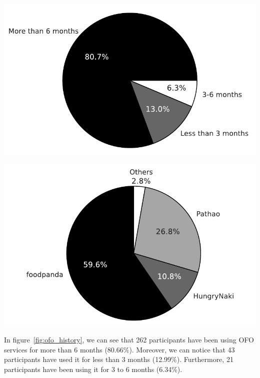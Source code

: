 \documentclass[a4paper,fleqn]{cas-sc}
\begin{document}
\begin{minipage}{.5\textwidth}
\centering
  \includegraphics[width=.9\linewidth]{figs/ordering_history.pdf}
  \label{fig:ofo_history}
\end{minipage}%
\begin{minipage}{.5\textwidth}
\centering
  \includegraphics[width=.9\linewidth]{figs/ofo_apps.pdf}
  \label{fig:ofo_apps}
\end{minipage}

In figure~\ref{fig:ofo_history}, we can see that 262 participants have been using OFO services for more than 6 months (80.66\%). Moreover, we can notice that 43 participants have used it for less than 3 months (12.99\%). Furthermore, 21 participants have been using it for 3 to 6 months (6.34\%).

\end{document}
